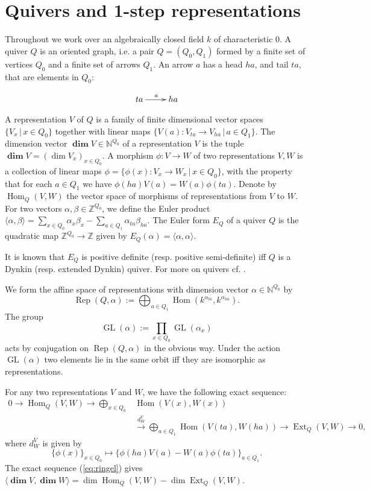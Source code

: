 \documentclass[twoside]{article}
\newcommand{\ds}{\displaystyle\sum}
\newcommand{\nat}{\mathbb{N}}
\newcommand{\integ}{\mathbb{Z}}
\DeclareMathOperator{\Dim}{\mathbf{dim}}
\newcommand{\Hom}{\operatorname{Hom}}
\newcommand{\Ext}{\operatorname{Ext}}
\newcommand{\GL}{\operatorname{GL}}
\newcommand{\Rep}{\operatorname{Rep}}
\theoremstyle{definition}
\begin{document}
\section{Quivers and 1-step representations}
\label{sec:quiv}

Throughout we work over an algebraically closed field $k$ of characteristic $0$. A quiver $Q$ is an oriented graph, i.e. a pair $Q=(Q_0,Q_1)$ formed by a finite set of vertices $Q_0$ and a finite set of arrows $Q_1$. An arrow $a$ has a head $ha$, and tail $ta$, that are elements in $Q_0$:

\[\xymatrix{
ta \ar[r]^{a} & ha
}\]

A representation $V$ of $Q$ is a family of finite dimensional vector spaces $\{V_x\,|\, x\in Q_0\}$ together with linear maps $\{V(a) : V_{ta}\to V_{ha}\, | \, a\in Q_1\}$. The dimension vector $\Dim V\in \nat^{Q_0}$ of a representation $V$ is the tuple $\Dim V=(\dim V_x)_{x\in Q_0}$. A morphism $\phi:V\to W$ of two representations $V,W$ is a collection of linear maps $\phi = \{\phi(x) : V_x \to W_x\,| \,x\in Q_0\}$, with the property that for each $a\in Q_1$ we have $\phi(ha)V(a)=W(a)\phi(ta)$. Denote by $\Hom_Q(V,W)$ the vector space of morphisms of representations from $V$ to $W$. For two vectors $\alpha, \beta\in \integ^{Q_0}$, we define the Euler product $\langle \alpha, \beta \rangle = \ds_{x\in Q_0} \alpha_x \beta_x - \ds_{a\in Q_1} \alpha_{ta} \beta_{ha}$. The Euler form $E_Q$ of a quiver $Q$ is the quadratic map $\integ^{Q_0}\to \integ$ given by
$E_Q(\alpha)= \langle \alpha, \alpha \rangle$.

It is known that $E_Q$ is positive definite (resp. positive semi-definite)  iff $Q$ is a Dynkin (resp. extended Dynkin) quiver. For more on quivers cf. \cite{elements,quad}.

We form the affine space of representations with dimension vector $\alpha\in \nat^{Q_0}$ by
$$\Rep(Q,\alpha):=\displaystyle\bigoplus_{a\in Q_1} \Hom(k^{\alpha_{ta}},k^{\alpha_{ha}}).$$
The group 
$$\GL(\alpha):= \prod_{x\in Q_0} \GL(\alpha_x)$$
acts by conjugation on $\Rep(Q,\alpha)$ in the obvious way. Under the action $\GL(\alpha)$ two elements lie in the same orbit iff they are isomorphic as representations. 

For any two representations $V$ and $W$, we have the following exact sequence:
\begin{equation}\label{eq:ringel}
\begin{array}{rlc}
0 \to \Hom_Q (V,W) \longrightarrow \displaystyle\bigoplus_{x \in Q_0}& \!\!\!\!\!\Hom(V(x),W(x)) & \\
& \stackrel{d^V_W}{\longrightarrow}  \displaystyle\bigoplus_{a\in Q_1} \Hom(V(ta),W(ha)) \longrightarrow \Ext_Q(V,W)\to 0, &
\end{array}
\end{equation}
where $d_W^V$ is given by
$$\{\phi(x)\}_{x\in Q_0} \mapsto \{\phi(ha)V(a) - W(a)\phi(ta)\}_{a\in Q_1}.$$
The exact sequence (\ref{eq:ringel}) gives $\langle \Dim V,\Dim W \rangle = \dim \Hom_Q(V,W) - \dim \Ext_Q(V,W)$.
\end{document}
